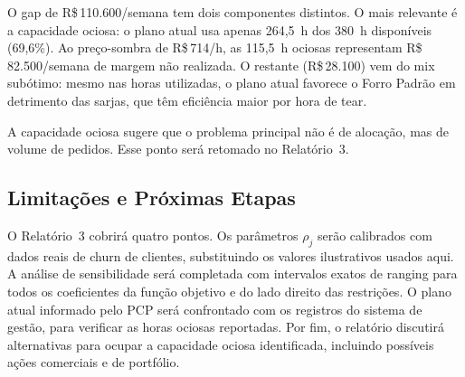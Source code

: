 O gap de R\$\,110.600/semana tem dois componentes distintos. O mais relevante
é a capacidade ociosa: o plano atual usa apenas 264,5~h dos 380~h disponíveis
(69,6\%). Ao preço-sombra de R\$\,714/h, as 115,5~h ociosas representam
R\$\,82.500/semana de margem não realizada. O restante (R\$\,28.100) vem do
mix subótimo: mesmo nas horas utilizadas, o plano atual favorece o Forro Padrão
em detrimento das sarjas, que têm eficiência maior por hora de tear.

A capacidade ociosa sugere que o problema principal não é de alocação, mas de
volume de pedidos. Esse ponto será retomado no Relatório~3.

\subsection{Limitações e Próximas Etapas}

O Relatório~3 cobrirá quatro pontos. Os parâmetros $\rho_j$ serão calibrados
com dados reais de churn de clientes, substituindo os valores ilustrativos
usados aqui. A análise de sensibilidade será completada com intervalos exatos
de ranging para todos os coeficientes da função objetivo e do lado direito das
restrições. O plano atual informado pelo PCP será confrontado com os registros
do sistema de gestão, para verificar as horas ociosas reportadas. Por fim, o
relatório discutirá alternativas para ocupar a capacidade ociosa identificada,
incluindo possíveis ações comerciais e de portfólio.

\newpage
